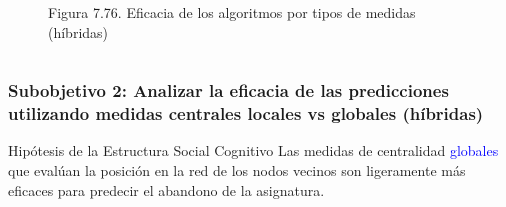 \documentclass{beamer}
\begin{document}
\begin{frame}
\begin{columns}[c]
\begin{column}{.5\textwidth}
\begin{figure}
				\caption{Figura 7.76. Eficacia de los algoritmos por tipos de medidas (híbridas)}
			\end{figure}
		\end{column}
	\end{columns}
\end{frame}



\begin{frame}
	\frametitle{Subobjetivo 2: Analizar la eficacia de las predicciones utilizando medidas centrales  locales vs globales (híbridas)}
	\begin{block}{Hipótesis de la Estructura Social Cognitivo }
Las medidas de centralidad \textcolor{blue}{globales} que evalúan la posición en la red de los nodos vecinos son ligeramente más eficaces para predecir el abandono de la asignatura.
	\end{block}
	

\end{frame}
\end{document}
